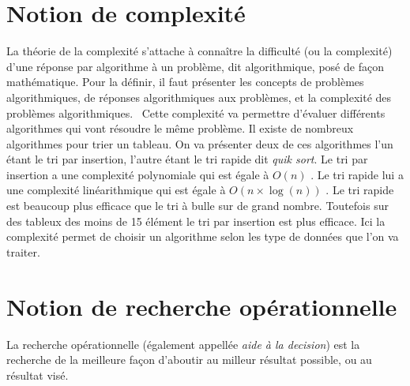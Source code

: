 \section{Notion de complexité}
La théorie de la complexité s'attache à connaître la difficulté (ou la
complexité) d'une réponse par algorithme à un problème, dit algorithmique, posé
de façon mathématique. Pour la définir, il faut présenter les concepts de
problèmes algorithmiques, de réponses algorithmiques aux problèmes, et la
complexité des problèmes algorithmiques.~\cite{wp-complex} 
Cette complexité va permettre d'évaluer différents algorithmes qui vont 
résoudre le même problème. 
 Il existe de nombreux algorithmes pour trier un tableau. On va présenter deux 
de ces algorithmes l'un étant le tri par insertion, l'autre étant le tri rapide dit \emph{quik sort}.
Le tri par insertion a une complexité polynomiale qui est égale à $O(n)$ . 
Le tri rapide lui a une complexité linéarithmique qui est égale à $O(n \times \log(n) )$ . 
Le tri rapide est beaucoup plus efficace que le tri à bulle sur de  grand nombre. 
Toutefois sur des tableux des moins de 15 élément le tri par insertion est plus efficace. 
Ici la complexité permet de choisir un algorithme selon les type de données que l'on va traiter.

\section{Notion de recherche opérationnelle}
La recherche opérationnelle (également appellée \emph{aide à la decision})
est la recherche de la meilleure façon d'aboutir au milleur résultat
possible, ou au résultat visé.
